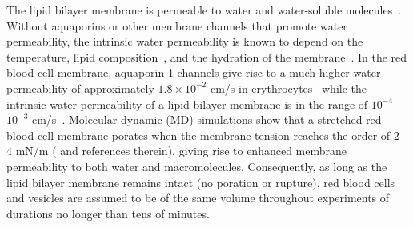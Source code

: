 \documentclass[9pt,twocolumn,twoside,lineno]{pnas-new}
\begin{document}
The lipid bilayer membrane is permeable to water and water-soluble
molecules~\cite{Dick1964_JTB, FettiplaceHaydon1980_PhysRev,
DeamerBramhall1986_ChemPhysLipids, Grafmueller2019_ABLS}. 
%
%
Without aquaporins or other membrane channels that promote water
permeability, the intrinsic water permeability is known to depend on the
temperature, lipid composition~\cite{OlbrichRawiczNeedhamEtAl2000_BJ}, 
and the hydration of
the membrane~\cite{MarrinkBerendsen1994_JPhysChem}. In the red blood
cell membrane, aquaporin-1 channels give rise to a much higher water
permeability of approximately $1.8\times 10^{-2}$ cm/s in
erythrocytes~\cite{YangMaVerkman2001_JBC} while the intrinsic water
permeability of a lipid bilayer membrane is in the range of
$10^{-4}$--$10^{-3}$ cm/s~\cite{ThompsonHuang1966_ANYAS,
FettiplaceHaydon1980_PhysRev, Grafmueller2019_ABLS, Dimova2020_GVB,
BhatiaRobinsonDimova2020_SoftMatt}. 
%
Molecular dynamic (MD) simulations show that a stretched red blood cell
membrane porates when the membrane tension reaches the order of $2$--$4$
mN/m (\cite{RazizadehNikfarPaulLiu2020_BJ} and references therein),
giving rise to enhanced membrane permeability to both water and
macromolecules. Consequently, as long as the lipid bilayer membrane
remains intact (no poration or rupture), red blood cells and vesicles
are assumed to be of the same volume throughout experiments of durations
no longer than tens of minutes.
%
\end{document}
